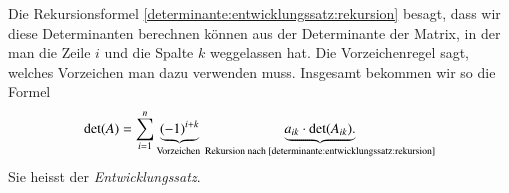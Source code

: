 Die Rekursionsformel \eqref{determinante:entwicklungssatz:rekursion}
besagt, dass wir diese Determinanten berechnen können aus der
Determinante der Matrix, in der man die Zeile $i$ und die Spalte $k$
weggelassen hat.
Die Vorzeichenregel sagt, welches Vorzeichen man dazu verwenden muss.
Insgesamt bekommen wir so die Formel
\[
\det(A)
=
\sum_{i=1}^n
\underbrace{ (-1)^{i+k}}_{\text{Vorzeichen }}
\underbrace{
a_{ik}
\cdot
\det(A_{ik}).
}_{\text{Rekursion nach 
\eqref{determinante:entwicklungssatz:rekursion}}}
\]
Sie heisst der {\em Entwicklungssatz}.


